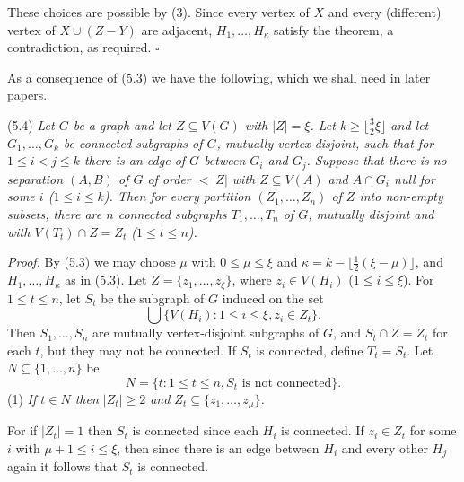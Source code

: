 These choices are possible by (3). Since every vertex of $X$ and every (different) vertex of $X \cup (Z - Y)$ are adjacent, $H_1, \dots, H_\kappa$ satisfy the theorem, a contradiction, as required. $\square$

As a consequence of (5.3) we have the following, which we shall need in later papers.

\stmt
(5.4) \textit{Let $G$ be a graph and let $Z \subseteq V(G)$ with $|Z| = \xi$. Let $k \ge \lfloor \frac{3}{2}\xi \rfloor$ and let $G_1, \dots, G_k$ be connected subgraphs of $G$, mutually vertex-disjoint, such that for $1 \le i < j \le k$ there is an edge of $G$ between $G_i$ and $G_j$. Suppose that there is no separation $(A, B)$ of $G$ of order $< |Z|$ with $Z \subseteq V(A)$ and $A \cap G_i$ null for some $i$ ($1 \le i \le k$). Then for every partition $(Z_1, \dots, Z_n)$ of $Z$ into non-empty subsets, there are $n$ connected subgraphs $T_1, \dots, T_n$ of $G$, mutually disjoint and with $V(T_t) \cap Z = Z_t$ ($1 \le t \le n$).}

\textit{Proof.} By (5.3) we may choose $\mu$ with $0 \le \mu \le \xi$ and $\kappa = k - \lfloor \frac{1}{2}(\xi - \mu) \rfloor$, and $H_1, \dots, H_\kappa$ as in (5.3). Let $Z = \{z_1, \dots, z_\xi\}$, where $z_i \in V(H_i)$ ($1 \le i \le \xi$). For $1 \le t \le n$, let $S_t$ be the subgraph of $G$ induced on the set
\begin{equation*}
\bigcup \{ V(H_i) : 1 \le i \le \xi, z_i \in Z_t \}.
\end{equation*}
Then $S_1, \dots, S_n$ are mutually vertex-disjoint subgraphs of $G$, and $S_t \cap Z = Z_t$ for each $t$, but they may not be connected. If $S_t$ is connected, define $T_t = S_t$. Let $N \subseteq \{1, \dots, n\}$ be
\begin{equation*}
N = \{ t : 1 \le t \le n, S_t \text{ is not connected} \}.
\end{equation*}
\hspace*{12pt}(1) \textit{If $t \in N$ then $|Z_t| \ge 2$ and $Z_t \subseteq \{z_1, \dots, z_\mu\}$.}

For if $|Z_t| = 1$ then $S_t$ is connected since each $H_i$ is connected. If $z_i \in Z_t$ for some $i$ with $\mu + 1 \le i \le \xi$, then since there is an edge between $H_i$ and every other $H_j$ again it follows that $S_t$ is connected.

